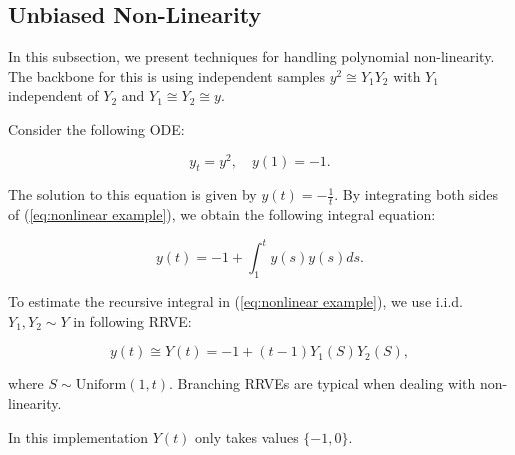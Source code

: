 \documentclass[a4paper,12pt]{article}
\begin{document}
\subsection{Unbiased Non-Linearity}

In this subsection, we present techniques for handling polynomial non-linearity.
The backbone for this is using independent samples
$y^{2} \cong Y_{1} Y_{2}$ with $Y_{1}$ independent of $ Y_{2}$ and
$Y_{1} \cong Y_{2} \cong y$.


\begin{example}[$y_t=y^{2}$] \label{ex:nonlinear example}
    Consider the following ODE:

    \begin{equation} \label{eq:nonlinear example}
        y_t = y^2, \quad y(1) = -1.
    \end{equation}

    The solution to this equation is given by $y(t) = -\frac{1}{t}$.
    By integrating both sides of (\ref{eq:nonlinear example}),
    we obtain the following integral equation:

    \begin{equation}
        y(t) = -1 + \int_{1}^{t} y(s) y(s)ds.
    \end{equation}

    To estimate the recursive integral in (\ref{eq:nonlinear example}),
    we use i.i.d. $Y_1,Y_2 \sim Y$ in following RRVE:

    \begin{equation} \label{RRVE: nonlinear example}
        y(t) \cong Y(t) = -1 + (t-1) Y_1(S) Y_2(S),
    \end{equation}

    where $S \sim \text{Uniform}(1,t)$.
    Branching RRVEs are typical when dealing
    with non-linearity.
\end{example}

\vspace*{0.2cm}
\begin{pythonn}\label{py:nonlinear example}
    In this implementation $Y(t)$ only takes values $\{-1,0\}$.
\end{pythonn}
\end{document}
